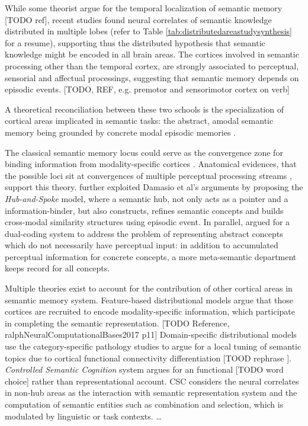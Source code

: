 While some theorist argue for the temporal localization of semantic memory [TODO ref], recent studies found neural correlates of semantic knowledge distributed in multiple lobes (refer to Table \ref{tab:distributedareastudysynthesis} for a resume), supporting thus the distributed hypothesis that semantic knowledge might be encoded in all brain areas. The cortices involved in semantic processing other than the temporal cortex, are strongly associated to perceptual, sensorial and affectual processings, suggesting that semantic memory depends on episodic events. [TODO, REF, e.g. premotor and sensorimotor cortex on verb]

A theoretical reconciliation between these two schools is the specialization of cortical areas implicated in semantic tasks: the abstract, amodal semantic memory being grounded by concrete modal episodic memories \parencite{pecherGroundingCognitionRole2005}. 

The classical semantic memory locus could serve as the convergence zone for binding information from modality-specific cortices \parencite{damasioNeuralBasisLexical1996, damasioNeuralSystemsWord2004, simmonsSimilarityintopographyPrincipleReconciling2003}. Anatomical evidences, that the possible loci sit at convergences of multiple perceptual processing streams \parencite{binderNeurobiologySemanticMemory2011}, support this theory. \cite{pattersonWhereYouKnow2007} further exploited Damasio et al's arguments by proposing the \emph{Hub-and-Spoke} model, where a semantic hub, not only acts as a pointer and a information-binder, but also constructs, refines semantic concepts and builds cross-modal similarity structures using episodic event. In parallel, \cite{paivioMindItsEvolution2008} argued for a dual-coding system to address the problem of representing abstract concepts which do not necessarily have perceptual input: in addition to accumulated perceptual information for concrete concepts, a more meta-semantic department keeps record for all concepts. 

Multiple theories exist to account for the contribution of other cortical areas in semantic memory system. Feature-based distributional models argue that those cortices are recruited to encode modality-specific information, which participate in completing the semantic representation. [TODO Reference, ralphNeuralComputationalBases2017 p11] Domain-specific distributional models \parencite{mahonWhatDrivesOrganization2011} use the category-specific pathology studies to argue for a local tuning of semantic topics due to cortical functional connectivity differentiation [TOOD rephrase ]. \emph{Controlled Semantic Cognition} \parencite{ralphNeuralComputationalBases2017} system argues for an functional [TODO word choice] rather than representational account. CSC considers the neural correlates in non-hub areas as the interaction with semantic representation system and the computation of semantic entities such as combination and selection, which is modulated by linguistic or task contexts. \dots


